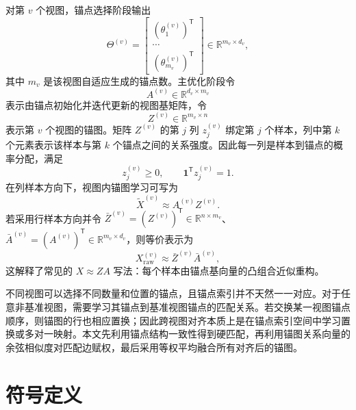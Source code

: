 \documentclass[UTF8,a4paper,12pt,fontset=none]{ctexart}
\newcommand{\R}{\mathbb{R}}
\newcommand{\one}{\mathbf{1}}
\newcommand{\T}{\mathsf{T}}
\begin{document}
对第 \(v\) 个视图，锚点选择阶段输出
\begin{equation}
\Theta^{(v)}
=
\begin{bmatrix}
(\theta_1^{(v)})^\T\\
\cdots\\
(\theta_{m_v}^{(v)})^\T
\end{bmatrix}
\in\R^{m_v\times d_v},
\end{equation}
其中 \(m_v\) 是该视图自适应生成的锚点数。主优化阶段令
\begin{equation}
A^{(v)}\in\R^{d_v\times m_v}
\end{equation}
表示由锚点初始化并迭代更新的视图基矩阵，令
\begin{equation}
Z^{(v)}\in\R^{m_v\times n}
\end{equation}
表示第 \(v\) 个视图的锚图。矩阵 \(Z^{(v)}\) 的第 \(j\) 列 \(z_j^{(v)}\) 绑定第 \(j\) 个样本，列中第 \(k\) 个元素表示该样本与第 \(k\) 个锚点之间的关系强度。因此每一列是样本到锚点的概率分配，满足
\begin{equation}
z_j^{(v)}\ge 0,\qquad \one^\T z_j^{(v)}=1 .
\end{equation}
在列样本方向下，视图内锚图学习可写为
\begin{equation}
\widetilde X^{(v)}\approx A^{(v)}Z^{(v)} .
\end{equation}
若采用行样本方向并令
\(\bar Z^{(v)}=(Z^{(v)})^\T\in\R^{n\times m_v}\)、
\(\bar A^{(v)}=(A^{(v)})^\T\in\R^{m_v\times d_v}\)，则等价表示为
\begin{equation}
X_{\mathrm{raw}}^{(v)}\approx \bar Z^{(v)}\bar A^{(v)} ,
\end{equation}
这解释了常见的 \(X\approx ZA\) 写法：每个样本由锚点基向量的凸组合近似重构。

不同视图可以选择不同数量和位置的锚点，且锚点索引并不天然一一对应。对于任意非基准视图，需要学习其锚点到基准视图锚点的匹配关系。若交换某一视图锚点顺序，则锚图的行也相应置换；因此跨视图对齐本质上是在锚点索引空间中学习置换或多对一映射。本文先利用锚点结构一致性得到硬匹配，再利用锚图关系向量的余弦相似度对匹配边赋权，最后采用等权平均融合所有对齐后的锚图。

\section{符号定义}
\end{document}
